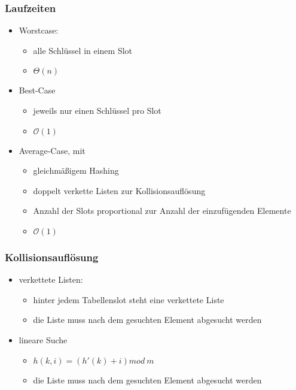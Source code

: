 	\begin{frame}
		\frametitle{Laufzeiten}
		\begin{itemize}
			\item Worstcase:
			\begin{itemize}
				\item alle Schlüssel in einem Slot 
				\item $\Theta (n)$
			\end{itemize}
			\item Best-Case
			\begin{itemize}
				\item jeweils nur einen Schlüssel pro Slot
				\item $\mathcal{O}(1)$
			\end{itemize}
			\item Average-Case, mit
			\begin{itemize}
				\item gleichmäßigem Hashing
				\item doppelt verkette Listen zur Kollisionsauflösung
				\item Anzahl der Slots proportional zur Anzahl der einzufügenden Elemente 
				\item $\mathcal{O}(1)$
			\end{itemize}
		\end{itemize}
	\end{frame}

	\begin{frame}
		\frametitle{Kollisionsauflösung}
		\begin{itemize}
			\item verkettete Listen:
			\begin{itemize}
				\item hinter jedem Tabellenslot steht eine verkettete Liste
				\item die Liste muss nach dem gesuchten Element abgesucht werden
			\end{itemize}
			\item lineare Suche
			\begin{itemize}
				\item $ h(k,i) = (h'(k)+i) mod \ m $
				\item die Liste muss nach dem gesuchten Element abgesucht werden
			\end{itemize}
		\end{itemize}
	\end{frame}

